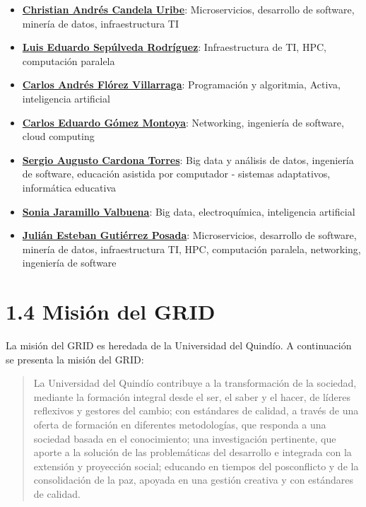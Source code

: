 \begin{itemize}
  \item \href{https://scienti.minciencias.gov.co/cvlac/visualizador/generarCurriculoCv.do?cod_rh=0000210897}{\textbf{Christian Andrés Candela Uribe}}: Microservicios, desarrollo de software, minería de datos, infraestructura TI
  \item \href{https://scienti.minciencias.gov.co/cvlac/visualizador/generarCurriculoCv.do?cod_rh=0001383939}{\textbf{Luis Eduardo Sepúlveda Rodríguez}}: Infraestructura de TI, HPC, computación paralela
  \item \href{https://scienti.minciencias.gov.co/cvlac/visualizador/generarCurriculoCv.do?cod_rh=0001638854}{\textbf{Carlos Andrés Flórez Villarraga}}: Programación y algoritmia, Activa, inteligencia artificial
  \item \href{https://scienti.minciencias.gov.co/cvlac/visualizador/generarCurriculoCv.do?cod_rh=0001343801}{\textbf{Carlos Eduardo Gómez Montoya}}: Networking, ingeniería de software, cloud computing
  \item \href{https://scienti.minciencias.gov.co/cvlac/visualizador/generarCurriculoCv.do?cod_rh=0001398775}{\textbf{Sergio Augusto Cardona Torres}}: Big data y análisis de datos, ingeniería de software, educación asistida por computador - sistemas adaptativos, informática educativa
  \item \href{https://scienti.minciencias.gov.co/cvlac/visualizador/generarCurriculoCv.do?cod_rh=0000193550}{\textbf{Sonia Jaramillo Valbuena}}: Big data, electroquímica, inteligencia artificial
  \item \href{https://scienti.minciencias.gov.co/cvlac/visualizador/generarCurriculoCv.do?cod_rh=0000283495}{\textbf{Julián Esteban Gutiérrez Posada}}: Microservicios, desarrollo de software, minería de datos, infraestructura TI, HPC, computación paralela, networking, ingeniería de software
\end{itemize}

\section*{1.4 Misión del GRID}

La misión del GRID es heredada de la Universidad del Quindío. A continuación se presenta la misión del GRID:

\begin{quote}
La Universidad del Quindío contribuye a la transformación de la sociedad, mediante la formación integral desde el ser, el saber y el hacer, de líderes reflexivos y gestores del cambio; con estándares de calidad, a través de una oferta de formación en diferentes metodologías, que responda a una sociedad basada en el conocimiento; una investigación pertinente, que aporte a la solución de las problemáticas del desarrollo e integrada con la extensión y proyección social; educando en tiempos del posconflicto y de la consolidación de la paz, apoyada en una gestión creativa y con estándares de calidad.
\end{quote}

